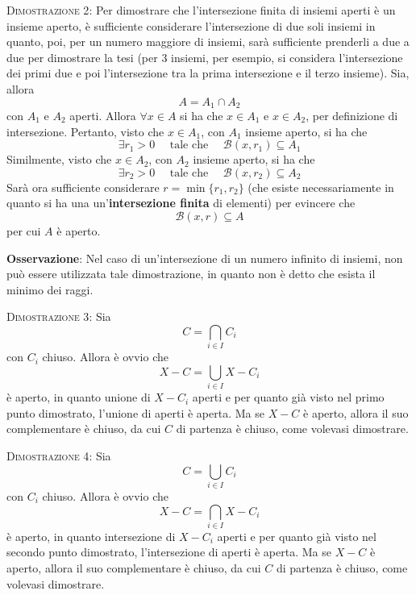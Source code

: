 \documentclass[a4paper]{extarticle}
\begin{document}
\vspace{2em}
\noindent
\normalfont \normalsize
\textsc{Dimostrazione 2}: Per dimostrare che l'intersezione finita di insiemi aperti è un insieme aperto, è sufficiente considerare l'intersezione di due soli insiemi in quanto, poi, per un numero maggiore di insiemi, sarà sufficiente prenderli a due a due per dimostrare la tesi (per $3$ insiemi, per esempio, si considera l'intersezione dei primi due e poi l'intersezione tra la prima intersezione e il terzo insieme). Sia, allora
\[A=A_1 \cap A_2\]
con $A_1$ e $A_2$ aperti. Allora $\forall x \in A$ si ha che $x \in A_1$ e $x \in A_2$, per definizione di intersezione. Pertanto, visto che $x \in A_1$, con $A_1$ insieme aperto, si ha che
\[\exists r_1 > 0 \hspace{1em} \text{ tale che } \hspace{1em} \mathcal{B}(x,r_1) \subseteq A_1\]
Similmente, visto che $x \in A_2$, con $A_2$ insieme aperto, si ha che
\[\exists r_2 > 0 \hspace{1em} \text{ tale che } \hspace{1em} \mathcal{B}(x,r_2) \subseteq A_2\]
Sarà ora sufficiente considerare $r=\min\{r_1,r_2\}$ (che esiste necessariamente in quanto si ha una un'\textbf{intersezione finita} di elementi) per evincere che
\[\mathcal{B}(x,r) \subseteq A\]
per cui $A$ è aperto.

\vspace{1em}
\noindent
\textbf{Osservazione}: Nel caso di un'intersezione di un numero infinito di insiemi, non può essere utilizzata tale dimostrazione, in quanto non è detto che esista il minimo dei raggi.

\vspace{2em}
\noindent
\normalfont \normalsize
\textsc{Dimostrazione 3}: Sia
\[C = \bigcap_{i \in I} C_i\]
con $C_i$ chiuso. Allora è ovvio che
\[X-C=\bigcup_{i \in I} X - C_i\]
è aperto, in quanto unione di $X-C_i$ aperti e per quanto già visto nel primo punto dimostrato, l'unione di aperti è aperta. Ma se $X-C$ è aperto, allora il suo complementare è chiuso, da cui $C$ di partenza è chiuso, come volevasi dimostrare.

\vspace{2em}
\noindent
\normalfont \normalsize
\textsc{Dimostrazione 4}: Sia
\[C = \bigcup_{i \in I} C_i\]
con $C_i$ chiuso. Allora è ovvio che
\[X-C=\bigcap_{i \in I} X - C_i\]
è aperto, in quanto intersezione di $X-C_i$ aperti e per quanto già visto nel secondo punto dimostrato, l'intersezione di aperti è aperta. Ma se $X-C$ è aperto, allora il suo complementare è chiuso, da cui $C$ di partenza è chiuso, come volevasi dimostrare.
\end{document}
